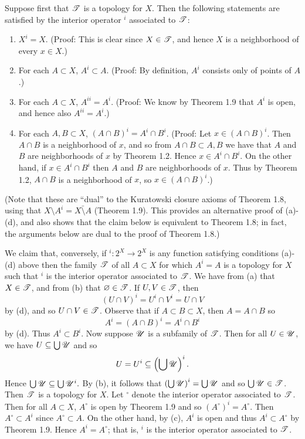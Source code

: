\begin{prob}
Suppose first that $\mathscr{T}$ is a topology for $X$. Then the following statements are satisfied by the interior operator $^i$ associated to $\mathscr{T}$:
\begin{enumerate}
\item $X^i = X$. (Proof: This is clear since $X \in \mathscr{T}$, and hence $X$ is a neighborhood of every $x \in X$.)

\item For each $A \subset X$, $A^i \subset A$. (Proof: By definition, $A^i$ consists only of points of $A$.)

\item For each $A \subset X$, $A^{ii} = A^i$. (Proof: We know by Theorem 1.9 that $A^i$ is open, and hence also $A^{ii} = A^i$.)

\item For each $A, B \subset X$, $(A\cap B)^i = A^i\cap B^i$. (Proof: Let $x \in (A\cap B)^i$. Then $A\cap B$ is a neighborhood of $x$, and so from $A\cap B \subset A, B$ we have that $A$ and $B$ are neighborhoods of $x$ by Theorem 1.2. Hence $x \in A^i\cap B^i$. On the other hand, if $x \in A^i\cap B^i$ then $A$ and $B$ are neighborhoods of $x$. Thus by Theorem 1.2, $A\cap B$ is a neighborhood of $x$, so $x \in (A\cap B)^i$.)
\end{enumerate}
(Note that these are ``dual'' to the Kuratowski closure axioms of Theorem 1.8, using that $X\setminus A^i = \bar{X\setminus A}$ (Theorem 1.9). This provides an alternative proof of (a)-(d), and also shows that the claim below is equivalent to Theorem 1.8; in fact, the arguments below are dual to the proof of Theorem 1.8.)

We claim that, conversely, if $^i: 2^X \to 2^X$ is any function satisfying conditions (a)-(d) above then the family $\mathscr{T}$ of all $A \subset X$ for which $A^i = A$ is a topology for $X$ such that $^i$ is the interior operator associated to $\mathscr{T}$. We have from (a) that $X \in \mathscr{T}$, and from (b) that $\varnothing \in \mathscr{T}$. If $U, V \in \mathscr{T}$, then \[(U\cap V)^i = U^i\cap V^i = U\cap V\] by (d), and so $U \cap V \in \mathscr{T}$. Observe that if $A \subset B \subset X$, then $A = A\cap B$ so \[A^i = (A\cap B)^i = A^i\cap B^i\] by (d). Thus $A^i \subset B^i$. Now suppose $\mathscr{U}$ is a subfamily of $\mathscr{T}$. Then for all $U \in \mathscr{U}$, we have $U \subseteq \bigcup\mathscr{U}$ and so \[U = U^i \subseteq \left(\bigcup\mathscr{U}\right)^i.\] Hence $\bigcup\mathscr{U} \subseteq \bigcup\mathscr{U}^i.$ By (b), it follows that $\left(\bigcup\mathscr{U}\right)^i = \bigcup\mathscr{U}$ and so $\bigcup\mathscr{U} \in \mathscr{T}$. Then $\mathscr{T}$ is a topology for $X$. Let $^{\circ}$ denote the interior operator associated to $\mathscr{T}$. Then for all $A \subset X$, $A^{\circ}$ is open by Theorem 1.9 and so $(A^{\circ})^i = A^{\circ}$. Then $A^{\circ} \subset A^i$ since $A^{\circ} \subset A$. On the other hand, by (c), $A^i$ is open and thus $A^i \subset A^{\circ}$ by Theorem 1.9. Hence $A^i = A^{\circ}$; that is, $^i$ is the interior operator associated to $\mathscr{T}$.
\end{prob}

